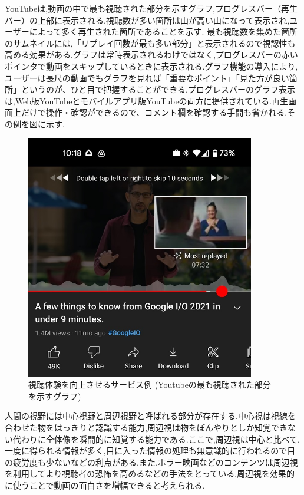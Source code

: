 YouTubeは,動画の中で最も視聴された部分を示すグラフ,プログレスバー（再生バー）の上部に表示される.視聴数が多い箇所は山が高い山になって表示され,ユーザーによって多く再生された箇所であることを示す.
最も視聴数を集めた箇所のサムネイルには,「リプレイ回数が最も多い部分」と表示されるので視認性も高める効果がある.グラフは常時表示されるわけではなく,プログレスバーの赤いポインタで動画をスキップしているときに表示される.グラフ機能の導入により,ユーザーは長尺の動画でもグラフを見れば「重要なポイント」「見た方が良い箇所」というのが、ひと目で把握することができる.プログレスバーのグラフ表示は,Web版YouTubeとモバイルアプリ版YouTubeの両方に提供されている.再生画面上だけで操作・確認ができるので、コメント欄を確認する手間も省かれる.その例を図に示す.
\begin{figure}[H]
    \centering
    \includegraphics[width=10cm]{images/chapter1/YouTube.jpeg}
    \caption{視聴体験を向上させるサービス例 (Youtubeの最も視聴された部分を示すグラフ)}
\end{figure}

人間の視野には中心視野と周辺視野と呼ばれる部分が存在する.中心視は視線を合わせた物をはっきりと認識する能力,周辺視は物をぼんやりとしか知覚できない代わりに全体像を瞬間的に知覚する能力である.ここで,周辺視は中心と比べて,一度に得られる情報が多く,目に入った情報の処理も無意識的に行われるので目の疲労度も少ないなどの利点がある.また,ホラー映画などのコンテンツは周辺視を利用してより視聴者の恐怖を高めるなどの手法をとっている.周辺視を効果的に使うことで動画の面白さを増幅できると考えられる.

